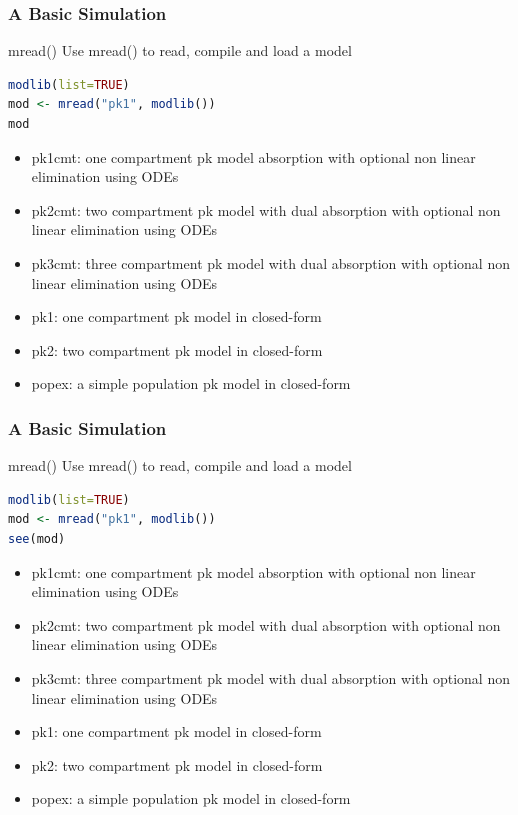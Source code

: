 \documentclass[
	11pt, %
]{beamer}
\begin{document}
\begin{frame}[fragile]{}
	\frametitle{A Basic Simulation}
	\begin{block}{mread()}
Use mread()	to read, compile and load a model
\begin{lstlisting}[language=R]
modlib(list=TRUE)
mod <- mread("pk1", modlib())
mod
\end{lstlisting}
     \begin{itemize}
     \tiny
     \item \textcolor{codepurple}{pk1cmt}: one compartment pk model absorption with optional non linear elimination using ODEs
     \item \textcolor{codepurple}{pk2cmt}: two compartment pk model with dual absorption with optional non linear elimination using ODEs
     \item \textcolor{codepurple}{pk3cmt}: three compartment pk model with dual absorption with optional non linear elimination using ODEs
     \item \textcolor{codepurple}{pk1}: one compartment pk model in closed-form
     \item \textcolor{codepurple}{pk2}: two compartment pk model in closed-form
     \item \textcolor{codepurple}{popex}: a simple population pk model in closed-form
     \end{itemize}
    \end{block}
    
\end{frame}

\begin{frame}[fragile]{}
	\frametitle{A Basic Simulation}
	\begin{block}{mread()}
Use mread()	to read, compile and load a model
\begin{lstlisting}[language=R]
modlib(list=TRUE)
mod <- mread("pk1", modlib())
see(mod)
\end{lstlisting}
     \begin{itemize}
     \tiny
     \item \textcolor{codepurple}{pk1cmt}: one compartment pk model absorption with optional non linear elimination using ODEs
     \item \textcolor{codepurple}{pk2cmt}: two compartment pk model with dual absorption with optional non linear elimination using ODEs
     \item \textcolor{codepurple}{pk3cmt}: three compartment pk model with dual absorption with optional non linear elimination using ODEs
     \item \textcolor{codepurple}{pk1}: one compartment pk model in closed-form
     \item \textcolor{codepurple}{pk2}: two compartment pk model in closed-form
     \item \textcolor{codepurple}{popex}: a simple population pk model in closed-form
     \end{itemize}
    \end{block}
    
\end{frame}
\end{document}
